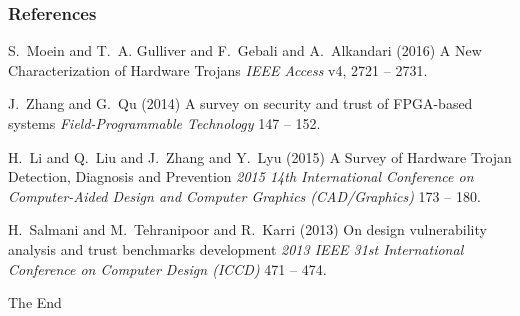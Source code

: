 \documentclass{beamer}
\begin{document}
%
%
%
%
%
%
\begin{frame}
\frametitle{References}
\footnotesize{
\begin{thebibliography}{99} %
 S.~Moein and T.~A. Gulliver and F.~Gebali and A.~Alkandari (2016)
\newblock A New Characterization of Hardware Trojans
\newblock \emph{IEEE Access} v4, 2721 -- 2731.

 J.~Zhang and G.~Qu (2014)
\newblock A survey on security and trust of FPGA-based systems
\newblock \emph{Field-Programmable Technology} 147 -- 152.

 H.~Li and Q.~Liu and J.~Zhang and Y.~Lyu (2015)
\newblock A Survey of Hardware Trojan Detection, Diagnosis and Prevention
\newblock \emph{2015 14th International Conference on Computer-Aided Design and Computer Graphics (CAD/Graphics)} 173 -- 180.

 H.~Salmani and M.~Tehranipoor and R.~Karri (2013)
\newblock On design vulnerability analysis and trust benchmarks development
\newblock \emph{2013 IEEE 31st International Conference on Computer Design (ICCD)} 471 -- 474.
\end{thebibliography}
}
\end{frame}
%
%
\begin{frame}
\Huge{\centerline{The End}}
\end{frame}

\end{document}
